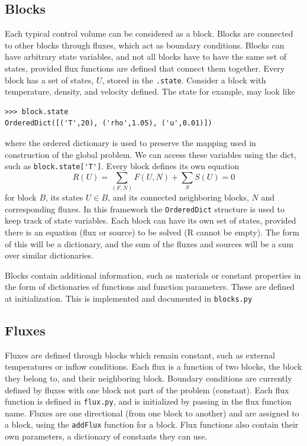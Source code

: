 \documentclass[11pt]{article}
\begin{document}
\subsection{Blocks}
Each typical control volume can be considered as a block. Blocks are connected to other blocks through fluxes, which act as boundary conditions. Blocks can have arbitrary state variables, and not all blocks have to have the same set of states, provided flux functions are defined that connect them together. Every block has a set of states, $U$, stored in the \lstinline{.state}. Consider a block with temperature, density, and velocity defined. The state for example, may look like
\begin{lstlisting}
>>> block.state
OrderedDict([('T',20), ('rho',1.05), ('u',0.01)])
\end{lstlisting}
where the ordered dictionary is used to preserve the mapping used in construction of the global problem. We can access these variables using the dict, such as \lstinline{block.state['T']}. Every block defines its own equation
\begin{equation}
R(U) = \sum_{(F,N)} F(U,N) + \sum_S S(U) = 0
\end{equation}
for block $B$, its states $U \in B$, and its connected neighboring blocks, $N$ and corresponding fluxes. In this framework the \lstinline{OrderedDict} structure is used to keep track of state variables. Each block can have its own set of states, provided there is an equation (flux or source) to be solved (R cannot be empty). The form of this will be a dictionary, and the sum of the fluxes and sources will be a sum over similar dictionaries.

Blocks contain additional information, such as materials or constant properties in the form of dictionaries of functions and function parameters. These are defined at initialization. This is implemented and documented in \lstinline{blocks.py}
\subsection{Fluxes}
Fluxes are defined through blocks which remain constant, such as external temperatures or inflow conditions. Each flux is a function of two blocks, the block they belong to, and their neighboring block. Boundary conditions are currently defined by fluxes with one block not part of the problem (constant). Each flux function is defined in \lstinline{flux.py}, and is initialized by passing in the flux function name. Fluxes are one directional (from one block to another) and are assigned to a block, using the \lstinline{addFlux} function for a block. Flux functions also contain their own parameters, a dictionary of constants they can use.
\end{document}
